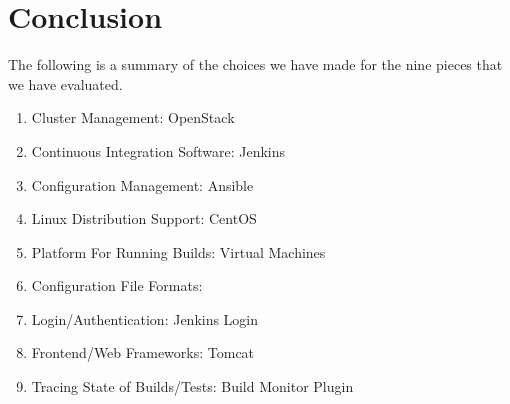 \documentclass[10pt,letterpaper,onecolumn,journal]{IEEEtran}
\begin{document}
\section{Conclusion}
The following is a summary of the choices we have made for the nine pieces that we have evaluated.\\
\begin{enumerate}
  \item Cluster Management: OpenStack
  \item Continuous Integration Software: Jenkins
  \item Configuration Management: Ansible
  \item Linux Distribution Support: CentOS
  \item Platform For Running Builds: Virtual Machines
  \item Configuration File Formats: 
  \item Login/Authentication: Jenkins Login
  \item Frontend/Web Frameworks: Tomcat
  \item Tracing State of Builds/Tests: Build Monitor Plugin
\end{enumerate}
\clearpage


\end{document}
